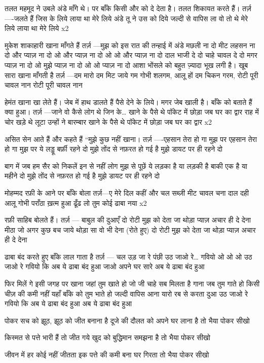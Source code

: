 तलत महमूद ने उबले अंडे माँगे थे। पर बाँके
किसी और को दे देता है। तलत शिकायत
करते हैं।
तर्ज़ —-जलते हैं जिस के लिये
लाया था मेरे लिये
अंडे तू ने उस को दिये
जल्दी से वापिस ला
वो तो थे मेरे लिये
लाया था मेरे लिये x2

मुकेश शाकाहारी खाना माँगते हैं
तर्ज़ —मुझ को इस रात की तन्हाई में
अंडे मछली ना दो
मीट लहसन ना दो
और प्याज़ ना दो ओ
और प्याज़ ना दो ओ ओ
और प्याज़ ना दो
दाल भाजी दे दो
चाहे चावल दे दो
मगर प्याज़ ना दो ओ
मुझे प्याज़ ना दो ओ
ओ प्याज़ ना दो
आशा भोंसले को बहुत ज़्यादा भूख लगी है।
खूब सारा खाना माँगती है
तर्ज़ —दम मारो दम मिट जाये गम
गोभी शलगम, आलू हों दम
चिकन गरम, रोटी पूरी चावल नान
रोटी पूरी चावल नान

हेमंत खाना खा लेते हैं। जेब में हाथ डालते हैं
पैसे देने के लिये। मगर जेब खाली है। बाँके
को बताते हैं क्या हुआ।
तर्ज़ —जाने वो कैसे लोग थे जिन के…
खाने के पैसे थे पॉकेट में
छोड़ा जब घर का द्वार
राह में चोर खड़े थे लूटा
उन्हों ने बारम्बार
खाने के पैसे थे पॉकेट में
छोड़ा जब घर का द्वार x2

असित सेन आते हैं और कहते हैं “मुझे कुछ
नहीं खाना।
तर्ज़ —-एहसान तेरा हो गा मुझ पर
एहसान तेरा हो गा मुझ पर
ये लड्डू बर्फ़ी रहने दो
मुझे तोंद से नफ़रत हो गई है
मुझे डायट पर ही रहने दो

बाग में जब हम सैर को निकलें
इन से नहीं लोग मुझ से पूछें
ये लड़का है या लड़की है
बाकी एक है या महीने दो
मुझे तोंद से नफ़रत हो गई है
मुझे डायट पर ही रहने दो

मोहम्मद रफ़ी के आने पर बाँके बोला
तर्ज़—ए मेरे दिल कहीं और चल
सब्ज़ी मीट चावल चना दाल दही
आलू गोभी पराँठा ख़त्म हुआ
ढूँढ लो तुम कोई ढाबा नया x2

रफ़ी साहिब बोलते हैं।
तर्ज़ — बाबुल की दुआएँ
दो रोटी मुझ को देता जा
थोड़ा प्याज़ अचार ही दे देना
मीठा जो अगर कुछ बच जाये
थोड़ा सा वो भी देना
(रोते हुए)
दो रोटी मुझ को देता जा
थोड़ा प्याज़ अचार ही दे देना

ढाबा बंद करते हुए बाँके लाल गाता है
तर्ज़ — चल उड़ जा रे पंछी
उठ जाओ रे… गवियो ओ ओ ओ
उठ जाओ रे गवियो कि अब ये ढाबा बंद हुआ
जाओ अपने घर सारे अब ये ढाबा बंद हुआ

फिर मिलें गे इसी जगह पर
खाना जहां तुम खाते हो
जो जी चाहे सब मिलता है
गाना जब तुम गाते हो
किसी चीज़ की कमी नहीं यहाँ
बाँके को तुम भाते हो
जल्दी वापिस आना यारो
रब से करता दुआ
उठ जाओ रे गवियो कि
अब ये ढाबा बंद हुआ
अब ये ढाबा बंद हुआ


पोकर
सच को झूठ, झूठ को जीत बनाना है
दूजे की दौलत को अपने घर लाना है
तो भैया पोकर सीखो

किस्मत से पत्ते भारी हैं तो जीत गये
खुद को बुद्धिमान समझना है
तो भैया पोकर सीखो

जीवन में हर कोई नहीं जीतता
इक पत्ते की कमी बना घर गिरता
तो भैया पोकर सीखो

